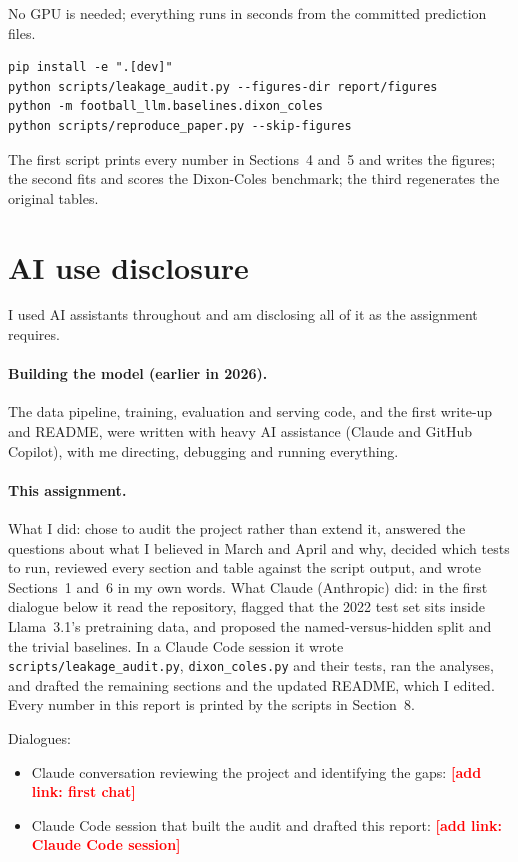 \documentclass[10pt,letterpaper]{article}
\newcommand{\addlink}[1]{\textcolor{red}{\textbf{[add link: #1]}}}
\begin{document}
No GPU is needed; everything runs in seconds from the committed prediction files.
{\small\begin{verbatim}
pip install -e ".[dev]"
python scripts/leakage_audit.py --figures-dir report/figures
python -m football_llm.baselines.dixon_coles
python scripts/reproduce_paper.py --skip-figures
\end{verbatim}}
The first script prints every number in Sections~4 and~5 and writes the figures; the second
fits and scores the Dixon-Coles benchmark; the third regenerates the original tables.

\section{AI use disclosure}

I used AI assistants throughout and am disclosing all of it as the assignment requires.

\paragraph{Building the model (earlier in 2026).} The data pipeline, training, evaluation and
serving code, and the first write-up and README, were written with heavy AI assistance
(Claude and GitHub Copilot), with me directing, debugging and running everything.

\paragraph{This assignment.} What I did: chose to audit the project rather than extend it,
answered the questions about what I believed in March and April and why, decided which
tests to run, reviewed every section and table against the script output, and wrote
Sections~1 and~6 in my own words. What Claude (Anthropic) did: in the first dialogue below it
read the repository, flagged that the 2022 test set sits inside Llama~3.1's pretraining data,
and proposed the named-versus-hidden split and the trivial baselines. In a Claude Code
session it wrote \texttt{scripts/leakage\_audit.py}, \texttt{dixon\_coles.py} and their tests,
ran the analyses, and drafted the remaining sections and the updated README, which I edited.
Every number in this report is printed by the scripts in Section~8.

Dialogues:
\begin{itemize}
\item Claude conversation reviewing the project and identifying the gaps: \addlink{first chat}
\item Claude Code session that built the audit and drafted this report: \addlink{Claude Code session}
\end{itemize}
\end{document}
